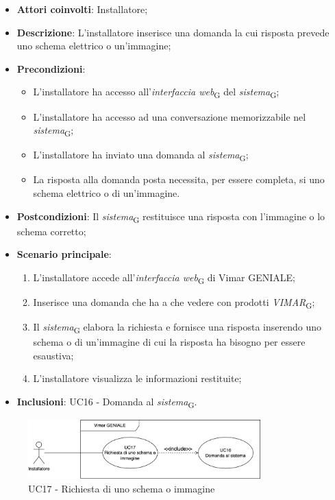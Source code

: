 \begin{itemize}
    \item \textbf{Attori coinvolti}: Installatore;
    \item \textbf{Descrizione}: L’installatore inserisce una domanda la cui risposta prevede uno schema elettrico o un'immagine;
    \item \textbf{Precondizioni}: 
        \begin{itemize}
            \item L’installatore ha accesso all’\textit{interfaccia web}\textsubscript{G} del \textit{sistema}\textsubscript{G};
            \item L’installatore ha accesso ad una conversazione memorizzabile nel \textit{sistema}\textsubscript{G};
            \item L'installatore ha inviato una domanda al \textit{sistema}\textsubscript{G};
            \item La risposta alla domanda posta necessita, per essere completa, si uno schema elettrico o di un'immagine.
        \end{itemize}
    \item \textbf{Postcondizioni}: Il \textit{sistema}\textsubscript{G} restituisce una risposta con l'immagine o lo schema corretto;
    \item \textbf{Scenario principale}:
    \begin{enumerate}
    \item L’installatore accede all’\textit{interfaccia web}\textsubscript{G} di Vimar GENIALE;
    \item Inserisce una domanda che ha a che vedere con prodotti \textit{VIMAR}\textsubscript{G};
    \item Il \textit{sistema}\textsubscript{G} elabora la richiesta e fornisce una risposta inserendo uno schema o di un'immagine di cui la risposta ha bisogno per essere esaustiva;
    \item L’installatore visualizza le informazioni restituite;
    \end{enumerate}
    \item \textbf{Inclusioni}: UC16 - Domanda al \textit{sistema}\textsubscript{G}.
\end{itemize}
\begin{figure}[H]
\centering
\includegraphics[width=0.8\textwidth]{contents/casi_duso/png/UC17.png}
\caption{UC17 - Richiesta di uno schema o immagine}
\end{figure}


